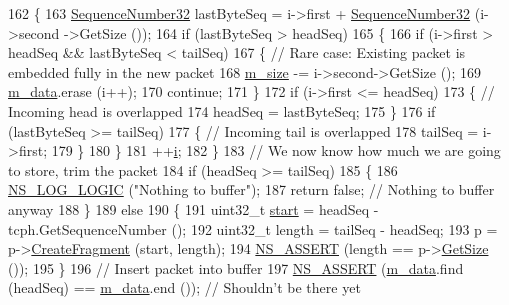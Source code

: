 \begin{DoxyCode}
162     \{
163       \hyperlink{group__network_gacb2070e4e98d2d5135c9bede58f07a03}{SequenceNumber32} lastByteSeq = i->first + \hyperlink{group__network_gacb2070e4e98d2d5135c9bede58f07a03}{SequenceNumber32} (i->second
      ->GetSize ());
164       \textcolor{keywordflow}{if} (lastByteSeq > headSeq)
165         \{
166           \textcolor{keywordflow}{if} (i->first > headSeq && lastByteSeq < tailSeq)
167             \{ \textcolor{comment}{// Rare case: Existing packet is embedded fully in the new packet}
168               \hyperlink{classns3_1_1TcpRxBuffer_ad76a9d93027823422039c92e85d5d4ea}{m\_size} -= i->second->GetSize ();
169               \hyperlink{classns3_1_1TcpRxBuffer_a695c34ebc7bd328b49c507f101257aed}{m\_data}.erase (i++);
170               \textcolor{keywordflow}{continue};
171             \}
172           \textcolor{keywordflow}{if} (i->first <= headSeq)
173             \{ \textcolor{comment}{// Incoming head is overlapped}
174               headSeq = lastByteSeq;
175             \}
176           \textcolor{keywordflow}{if} (lastByteSeq >= tailSeq)
177             \{ \textcolor{comment}{// Incoming tail is overlapped}
178               tailSeq = i->first;
179             \}
180         \}
181       ++\hyperlink{bernuolliDistribution_8m_a6f6ccfcf58b31cb6412107d9d5281426}{i};
182     \}
183   \textcolor{comment}{// We now know how much we are going to store, trim the packet}
184   \textcolor{keywordflow}{if} (headSeq >= tailSeq)
185     \{
186       \hyperlink{group__logging_ga88acd260151caf2db9c0fc84997f45ce}{NS\_LOG\_LOGIC} (\textcolor{stringliteral}{"Nothing to buffer"});
187       \textcolor{keywordflow}{return} \textcolor{keyword}{false}; \textcolor{comment}{// Nothing to buffer anyway}
188     \}
189   \textcolor{keywordflow}{else}
190     \{
191       uint32\_t \hyperlink{namespacevisualizer_1_1core_a2a35e5d8a34af358b508dac8635754e0}{start} = headSeq - tcph.GetSequenceNumber ();
192       uint32\_t length = tailSeq - headSeq;
193       p = p->\hyperlink{classns3_1_1Packet_a16f6113606b355b2b346e2245fa2a3d0}{CreateFragment} (start, length);
194       \hyperlink{assert_8h_a6dccdb0de9b252f60088ce281c49d052}{NS\_ASSERT} (length == p->\hyperlink{classns3_1_1Packet_a462855c9929954d4301a4edfe55f4f1c}{GetSize} ());
195     \}
196   \textcolor{comment}{// Insert packet into buffer}
197   \hyperlink{assert_8h_a6dccdb0de9b252f60088ce281c49d052}{NS\_ASSERT} (\hyperlink{classns3_1_1TcpRxBuffer_a695c34ebc7bd328b49c507f101257aed}{m\_data}.find (headSeq) == \hyperlink{classns3_1_1TcpRxBuffer_a695c34ebc7bd328b49c507f101257aed}{m\_data}.end ()); \textcolor{comment}{// Shouldn't be there yet}

\end{DoxyCode}
